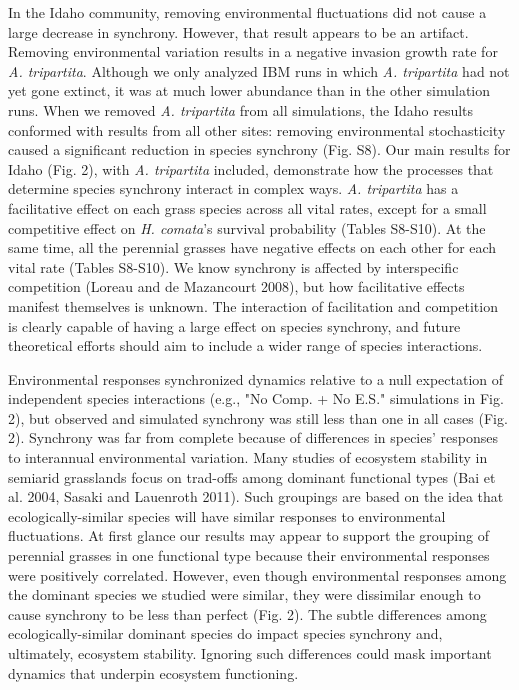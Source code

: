\documentclass[12pt,]{article}
\begin{document}
In the Idaho community, removing environmental fluctuations did not
cause a large decrease in synchrony. However, that result appears to be
an artifact. Removing environmental variation results in a negative
invasion growth rate for \emph{A. tripartita}. Although we only analyzed
IBM runs in which \emph{A. tripartita} had not yet gone extinct, it was
at much lower abundance than in the other simulation runs. When we
removed \emph{A. tripartita} from all simulations, the Idaho results
conformed with results from all other sites: removing environmental
stochasticity caused a significant reduction in species synchrony (Fig.
S8). Our main results for Idaho (Fig. 2), with \emph{A. tripartita}
included, demonstrate how the processes that determine species synchrony
interact in complex ways. \emph{A. tripartita} has a facilitative effect
on each grass species across all vital rates, except for a small
competitive effect on \emph{H. comata}'s survival probability (Tables
S8-S10). At the same time, all the perennial grasses have negative
effects on each other for each vital rate (Tables S8-S10). We know
synchrony is affected by interspecific competition (Loreau and {{de
Mazancourt}} 2008), but how facilitative effects manifest themselves is
unknown. The interaction of facilitation and competition is clearly
capable of having a large effect on species synchrony, and future
theoretical efforts should aim to include a wider range of species
interactions.

Environmental responses synchronized dynamics relative to a null expectation of independent species interactions (e.g., "No Comp. + No E.S." simulations in Fig. 2), but observed and simulated synchrony was still less than one in all cases (Fig. 2).
Synchrony was far from complete because of differences in species' responses to interannual environmental variation.
Many studies of ecosystem stability in semiarid grasslands focus on trad-offs among dominant functional types
(Bai et al. 2004, Sasaki and Lauenroth 2011).
Such groupings are based on the idea that ecologically-similar species will have similar responses to environmental fluctuations.
At first glance our results may appear to support the grouping of perennial grasses in one functional type because their environmental responses were positively correlated.
However, even though environmental responses among the dominant species we studied were similar, they were dissimilar enough to cause synchrony to be less than perfect (Fig. 2).
The subtle differences among ecologically-similar dominant species do impact species synchrony and, ultimately, ecosystem stability.
Ignoring such differences could mask important dynamics that underpin ecosystem functioning.
\end{document}
